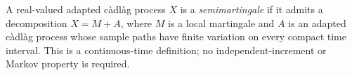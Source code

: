 
A real-valued adapted càdlàg process $X$ is a \emph{semimartingale} if it admits a decomposition $X=M+A$, where $M$ is a local martingale and $A$ is an adapted càdlàg process whose sample paths have finite variation on every compact time interval. This is a continuous-time definition; no independent-increment or Markov property is required.
